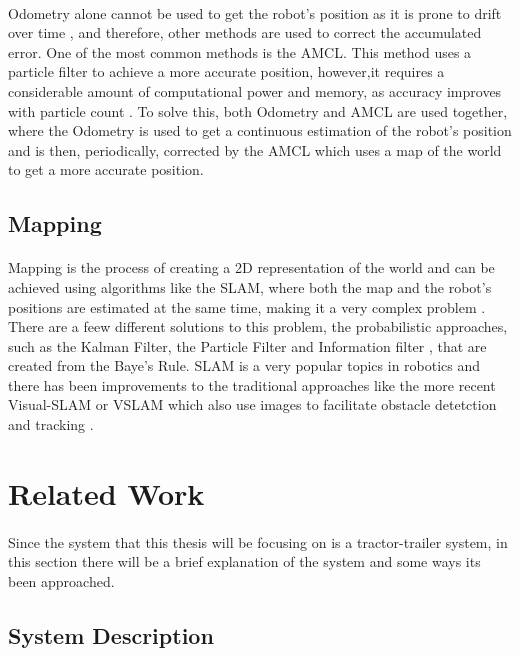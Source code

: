 \paragraph{}Odometry alone cannot be used to get the robot's position as it is prone to drift over time \cite{odom1}, 
and therefore, other methods are used to correct the accumulated error. One of the most common methods is 
the \gls{AMCL}. This method uses a particle filter to achieve a more accurate position, however,it requires 
a considerable amount of computational power and memory, as accuracy improves with particle count \cite{AMCL1}. To solve this, 
both Odometry and \gls{AMCL} are used together, where the Odometry is used to get a continuous estimation of the robot's position and is 
then, periodically, corrected by the \gls{AMCL} which uses a map of the world to get a more accurate position.

\subsection{Mapping}
\label{subsec:Mapping}
\paragraph{}Mapping is the process of creating a 2D representation of the world and can be achieved using 
algorithms like the \gls{SLAM}, where both the map and the robot's positions are 
estimated at the same time, making it a very complex problem \cite{SLAM1}. There are a feew different 
solutions to this problem, the probabilistic approaches, such as the Kalman Filter, the 
Particle Filter and Information filter \cite{SLAM1}, that are created from the Baye's Rule. \gls{SLAM} 
is a very popular topics in robotics and there has been improvements to the traditional approaches 
like the more recent Visual-SLAM or VSLAM which also use images to facilitate obstacle detetction and 
tracking \cite{VSLAM1}.
\section{Related Work}
\label{sec:TTS}
\paragraph{}Since the system that this thesis will be focusing on is a tractor-trailer system, 
in this section there will be a brief explanation of the system and some ways its been approached.

\subsection{System Description}
\label{subsec:SD}
